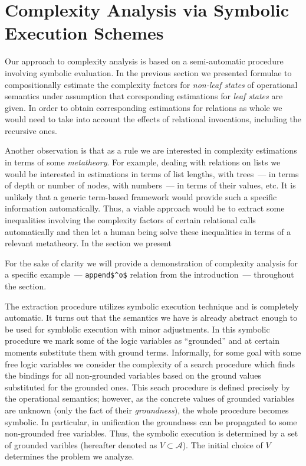 \section{Complexity Analysis via Symbolic Execution Schemes}
\label{sec:symbolic}

Our approach to complexity analysis is based on a semi-automatic procedure involving symbolic evaluation.
In the previous section we presented formulae to compositionally estimate the complexity factors for
\emph{non-leaf states} of operational semantics under assumption that coresponding estimations for
\emph{leaf states} are given. In order to obtain corresponding estimations for relations as whole we
would need to take into account the effects of relational invocations, including the recursive ones.

Another observation is that as a rule we are interested in complexity estimations in terms of some \emph{metatheory}. For
example, dealing with relations on lists we would be interested in estimations in terms of list lengths,
with trees~--- in terms of depth or number of nodes, with numbers~--- in terms of their values, etc. It is
unlikely that a generic term-based framework would provide such a specific information automatically. Thus,
a viable approach would be to extract some inequalities involving the complexity factors of certain relational
calls automatically and then let a human being solve these inequalities in terms of a relevant metatheory.
In the section we present 

For the sake of clarity we will provide a demonstration of complexity analysis for a specific example~---
\lstinline|append$^o$| relation from the introduction~--- throughout the section.

The extraction procedure utilizes symbolic execution technique and is completely automatic.
It turns out that the semantics we have is already abstract enough to be used for symblolic
execution with minor adjustments.
In this symbolic procedure we mark some of the logic variables as ``grounded'' and at certain
moments substitute them with ground terms.
Informally, for some goal with some free logic variables we consider the complexity of a search
procedure which finds the bindings for all non-grounded variables based on the ground values
substituted for the grounded ones.
This seach procedure is defined precisely by the operational semantics; however, as the concrete
values of grounded variables are unknown (only the fact of their \emph{groundness}), the whole
procedure becomes symbolic.
In particular, in unification the groundness can be propagated to some non-grounded free variables.
Thus, the symbolic execution is determined by a set of grounded varibles (hereafter denoted
as $V\subset\mathcal A$). The initial choice of $V$ determines the problem we analyze.

